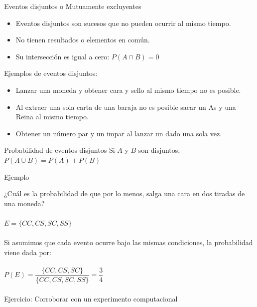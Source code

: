\documentclass[11pt, aspectratio=169]{beamer}
\begin{document}
\begin{frame}
{Eventos disjuntos o Mutuamente excluyentes}{}
 \centering
 \begin{itemize}
 \item Eventos disjuntos son sucesos que no pueden ocurrir al mismo tiempo.
 \item No tienen resultados o elementos en común.
 \item Su intersección es igual a cero: $ P(A \cap B) = 0 $
 \end{itemize}

 \vspace{1em}
 \pause
 Ejemplos de eventos disjuntos:

 \begin{itemize}
 \item Lanzar una moneda y obtener cara y sello al mismo tiempo no es
 posible.
 \item Al extraer una sola carta de una baraja no es posible sacar un As y
 una Reina al mismo tiempo.
 \item Obtener un número par y un impar al lanzar un dado una sola vez.
 \end{itemize}
\end{frame}

\begin{frame}
{Probabilidad de eventos disjuntos}{}
 \centering \Large
 Si $ A $ y $ B $ son disjuntos, $ P(A \cup B) = P(A) + P(B) $
\end{frame}

\begin{frame}
{Ejemplo}{}
 \centering \large

 ¿Cuál es la probabilidad de que por lo menos, salga una cara en dos tiradas
 de una moneda? \\~\\

 $ E = \{CC , CS, SC, SS\} $\\~\\

 Si asumimos que cada evento ocurre bajo las mismas condiciones, la
 probabilidad viene dada por: \\~\\

 $P(E) = \dfrac{ \{CC, CS, SC\} }{ \{CC , CS, SC, SS\} } = \dfrac{3}{4}$
 \\~\\

 Ejercicio: Corroborar con un experimento computacional
\end{frame}
\end{document}
